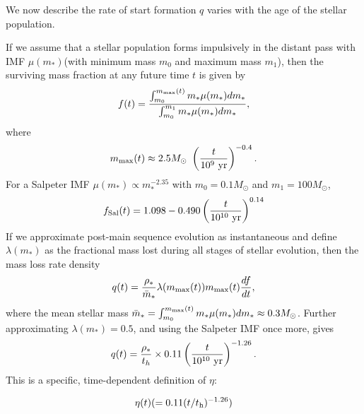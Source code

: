 We now describe the rate of start formation $q$ varies with the age of the stellar population.

If we assume that a stellar population forms impulsively in the distant pass with IMF $\mu(m_*)$(with minimum mass $m_0$ and maximum mass $m_1$), then the surviving mass fraction at any future time $t$ is given by 
\begin{equation}
f(t) =\frac{ \int_{m_0}^{m_{\rm max}(t)} m_* \mu(m_*) dm_* }{ \int_{m_0}^{m_1} m_* \mu(m_*) dm_* },
\end{equation}
where 
\begin{equation}
m_{\rm max}(t) \approx 2.5M_\odot~ \left( \frac{t}{10^9~{\rm yr}} \right)^{-0.4}.
\end{equation}
For a Salpeter IMF $\mu(m_*) \propto m_*^{-2.35}$ with $m_0=0.1M_\odot$ and $m_1=100M_\odot$,
\begin{equation}
f_{\rm Sal}(t) = 1.098 - 0.490 \left(\frac{t}{10^{10}~{\rm yr}} \right)^{0.14}
\end{equation}
If we approximate post-main sequence evolution as instantaneous and define $\lambda(m_*)$ as the fractional mass lost during all stages of stellar evolution, then the mass loss rate density
\begin{equation}
q(t) = \frac{\rho_*}{\bar{m}_*} \lambda(m_{\rm max}(t)) m_{\rm max}(t) \frac{df}{dt},
\end{equation}
where the mean stellar mass $\bar{m}_* = \int_{m_0}^{m_{\rm max}(t)} m_*\mu(m_*)dm_* \approx 0.3 M_\odot$.  Further approximating $\lambda(m_*)=0.5$, and using the Salpeter IMF once more, gives
\begin{equation}
q(t) = \frac{\rho_*}{t_h} \times 0.11 \left(\frac{t}{10^{10}~{\rm yr}} \right)^{-1.26}.
\end{equation}
This is a specific, time-dependent definition of $\eta$:

\begin{equation}
\eta(t) (=0.11(t/t_{\rm h})^{-1.26})
\label{eq:eta}
\end{equation}